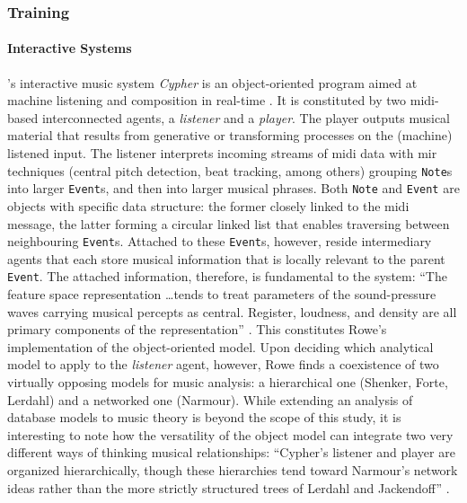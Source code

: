 \subsubsection{Training}
{
	\paragraph{Interactive Systems}
	\label{computer:cypher}

	\citeauthor{Row92:Int}'s interactive music system \textit{Cypher} is an object-oriented program aimed at machine listening and composition in real-time \parencite{Row92:Int}. It is constituted by two \gls{midi}-based interconnected agents, a \textit{listener} and a \textit{player}. The player outputs musical material that results from generative or transforming processes on the (machine) listened input. The listener interprets incoming streams of \gls{midi} data with \gls{mir} techniques (central pitch detection, beat tracking, among others) grouping \texttt{Note}s into larger \texttt{Event}s, and then into larger musical phrases. Both \texttt{Note} and \texttt{Event} are objects with specific data structure: the former closely linked to the \gls{midi} message, the latter forming a circular linked list that enables traversing between neighbouring \texttt{Event}s. Attached to these \texttt{Event}s, however, reside intermediary agents that each store musical information that is locally relevant to the parent \texttt{Event}. The attached information, therefore, is fundamental to the system: ``The feature space representation \dots tends to treat parameters of the sound-pressure waves carrying musical percepts as central. Register, loudness, and density are all primary components of the representation'' \parencite[Chapter~7]{Row92:Int}. This constitutes Rowe's implementation of the object-oriented model. Upon deciding which analytical model to apply to the \textit{listener} agent, however, Rowe finds a coexistence of two virtually opposing models for music analysis: a hierarchical one (Shenker, Forte, Lerdahl) and a networked one (Narmour). While extending an analysis of database models to music theory is beyond the scope of this study, it is interesting to note how the versatility of the object model can integrate two very different ways of thinking musical relationships: ``Cypher's listener and player are organized hierarchically, though these hierarchies tend toward Narmour's network ideas rather than the more strictly structured trees of Lerdahl and Jackendoff'' \parencite[Chapter~4.3]{Row92:Int}. 


}
